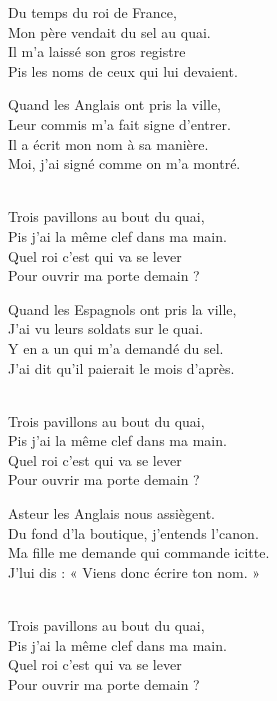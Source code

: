 \begin{lyrics}
Du temps du roi de France,\\
Mon père vendait du sel au quai.\\
Il m’a laissé son gros registre\\
Pis les noms de ceux qui lui devaient.

Quand les Anglais ont pris la ville,\\
Leur commis m’a fait signe d’entrer.\\
Il a écrit mon nom à sa manière.\\
Moi, j’ai signé comme on m’a montré.

\\
Trois pavillons au bout du quai,\\
Pis j’ai la même clef dans ma main.\\
Quel roi c’est qui va se lever\\
Pour ouvrir ma porte demain ?


Quand les Espagnols ont pris la ville,\\
J’ai vu leurs soldats sur le quai.\\
Y en a un qui m’a demandé du sel.\\
J’ai dit qu’il paierait le mois d’après.

\\
Trois pavillons au bout du quai,\\
Pis j’ai la même clef dans ma main.\\
Quel roi c’est qui va se lever\\
Pour ouvrir ma porte demain ?


Asteur les Anglais nous assiègent.\\
Du fond d’la boutique, j’entends l’canon.\\
Ma fille me demande qui commande icitte.\\
J’lui dis : « Viens donc écrire ton nom. »

\\
Trois pavillons au bout du quai,\\
Pis j’ai la même clef dans ma main.\\
Quel roi c’est qui va se lever\\
Pour ouvrir ma porte demain ?
\end{lyrics}

